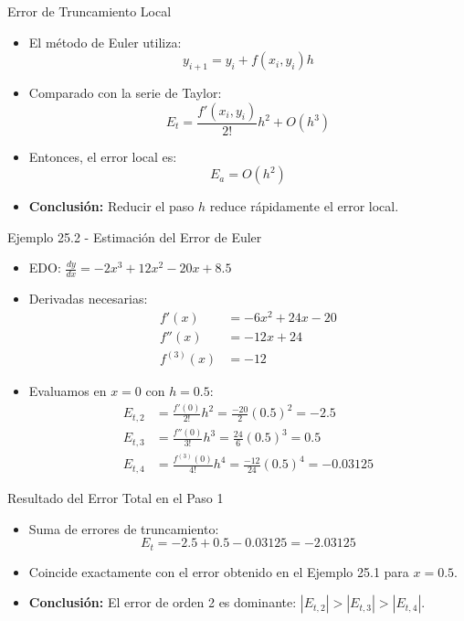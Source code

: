 \documentclass[main.tex]{subfiles}
\begin{document}
\begin{frame}{\small Error de Truncamiento Local}
\begin{itemize}
  \item El m\'etodo de Euler utiliza:
  \[
    y_{i+1} = y_i + f(x_i, y_i)h
  \]
  \item Comparado con la serie de Taylor:
  \[
    E_t = \frac{f'(x_i, y_i)}{2!}h^2 + O(h^3)
  \]
  \item Entonces, el error local es:
  \[
    E_a = O(h^2)
  \]
  \item \textbf{Conclusi\'on:} Reducir el paso $h$ reduce r\'apidamente el error local.
\end{itemize}
\end{frame}

\begin{frame}{\small Ejemplo 25.2 - Estimaci\'on del Error de Euler}
\begin{itemize}
  \item EDO: \( \frac{dy}{dx} = -2x^3 + 12x^2 - 20x + 8.5 \)
  \item Derivadas necesarias:
  \begin{align*}
    f'(x) &= -6x^2 + 24x - 20 \\
    f''(x) &= -12x + 24 \\
    f^{(3)}(x) &= -12
  \end{align*}
  \item Evaluamos en $x=0$ con $h=0.5$:
  \begin{align*}
    E_{t,2} &= \frac{f'(0)}{2!} h^2 = \frac{-20}{2} (0.5)^2 = -2.5 \\
    E_{t,3} &= \frac{f''(0)}{3!} h^3 = \frac{24}{6} (0.5)^3 = 0.5 \\
    E_{t,4} &= \frac{f^{(3)}(0)}{4!} h^4 = \frac{-12}{24} (0.5)^4 = -0.03125
  \end{align*}
\end{itemize}
\end{frame}

\begin{frame}{\small Resultado del Error Total en el Paso 1}
\begin{itemize}
  \item Suma de errores de truncamiento:
  \[
    E_t = -2.5 + 0.5 - 0.03125 = -2.03125
  \]
  \item Coincide exactamente con el error obtenido en el Ejemplo 25.1 para $x=0.5$.
  \item \textbf{Conclusi\'on:} El error de orden 2 es dominante: $|E_{t,2}| > |E_{t,3}| > |E_{t,4}|$.
\end{itemize}
\end{frame}
\end{document}
